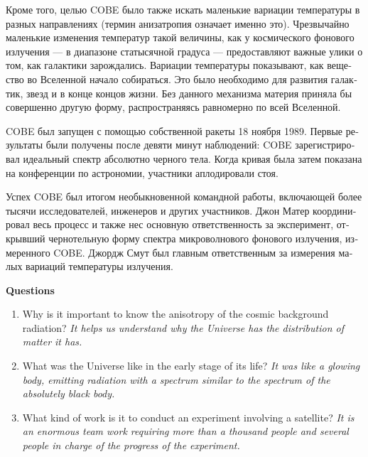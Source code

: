 \documentclass[a4paper, 12pt]{article}
\def\ans#1{\textit{#1}}
\begin{document}
\begin{otherlanguage}{russian}
	Кроме того, целью COBE было также искать маленькие вариации температуры 
	в разных направлениях (термин анизатропия означает именно это). Чрезвычайно 
	маленькие изменения температур такой величины, как у космического фонового 
	излучения --- в диапазоне статысячной градуса --- предоставляют важные улики 
	о том, как галактики зарождались. Вариации температуры показывают, как 
	вещество во Вселенной начало собираться. Это было необходимо для развития 
	галактик, звезд и в конце концов жизни. Без данного механизма материя приняла 
	бы совершенно другую форму, распространяясь равномерно по всей Вселенной.

	COBE был запущен с помощью собственной ракеты 18 ноября 1989. Первые 
	результаты были получены после девяти минут наблюдений: COBE зарегистрировал 
	идеальный спектр абсолютно черного тела. Когда кривая была затем показана на 
	конференции по астрономии, участники аплодировали стоя.

	Успех COBE был итогом необыкновенной командной работы, включающей более 
	тысячи исследователей, инженеров и других участников. Джон Матер 
	координировал весь процесс и также нес основную ответственность за 
	эксперимент, открывший чернотельную форму спектра микроволнового фонового 
	излучения, измеренного COBE. Джордж Смут был главным ответственным за 
	измерения малых вариаций температуры излучения.
\end{otherlanguage} %

\textbf{Questions}
\begin{enumerate}
	\item Why is it important to know the anisotropy of the cosmic background 
		radiation? \ans{It helps us understand why the Universe has the 
		distribution of matter it has.}
	\item What was the Universe like in the early stage of its life? \ans{It was 
		like a glowing body, emitting radiation with a spectrum similar to the 
		spectrum of the absolutely black body.}
	\item What kind of work is it to conduct an experiment involving a satellite? 
		\ans{It is an enormous team work requiring more than a thousand people and 
		several people in charge of the progress of the experiment.}
\end{enumerate}
\end{document}
